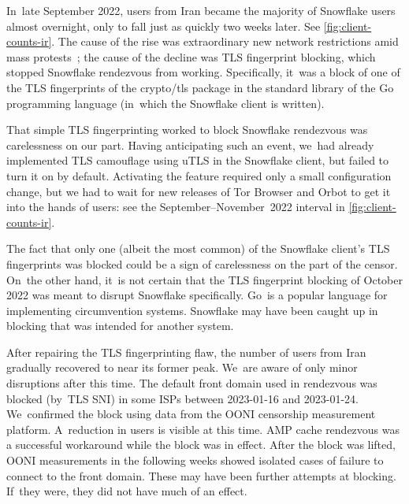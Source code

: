 \documentclass[letterpaper,twocolumn]{article}
\begin{document}
In~late September 2022,
users from Iran became the majority of Snowflake users almost overnight,
only to fall just as quickly two weeks later.
See \autoref{fig:client-counts-ir}.
The cause of the rise was
extraordinary new network restrictions amid mass protests~\cite{ooni-2022-iran-blocks-social-media-mahsa-amini-protests};
the cause of the decline was TLS fingerprint blocking,
which stopped Snowflake rendezvous from working.
Specifically, it~was a block of one of the TLS fingerprints
of the crypto/tls package in the standard library of
the Go programming language
(in~which the Snowflake client is written).

That simple TLS fingerprinting worked to block Snowflake rendezvous
was carelessness on our part.
Having anticipating such an event,
we~had already implemented TLS camouflage using uTLS
in the Snowflake client,
but failed to turn it on by default.
Activating the feature required only a small configuration change,
but we had to wait for new releases of Tor Browser and Orbot
to get it into the hands of users:
see the September--November~2022 interval in \autoref{fig:client-counts-ir}.

The fact that only one (albeit the most common)
of the Snowflake client's TLS fingerprints was blocked
could be a sign of carelessness on the part of the censor.
On~the other hand, it~is not certain that the TLS fingerprint blocking of October 2022
was meant to disrupt Snowflake specifically.
Go~is a popular language for implementing circumvention systems.
Snowflake may have been caught up in blocking that was intended for another system.


After repairing the TLS fingerprinting flaw,
the number of users from Iran gradually recovered
to near its former peak.
We~are aware of only minor disruptions after this time.
The default front domain used in rendezvous
was blocked (by~TLS SNI) in some ISPs
between \mbox{2023-01-16} and \mbox{2023-01-24}.
We~confirmed the block using data from the OONI
censorship measurement platform.
A~reduction in users is visible at this time.
AMP cache rendezvous was a successful workaround while the block was in effect.
After the block was lifted,
OONI measurements in the following weeks showed isolated cases
of failure to connect to the front domain.
These may have been further attempts at blocking.
If~they were, they did not have much of an effect.
\end{document}
